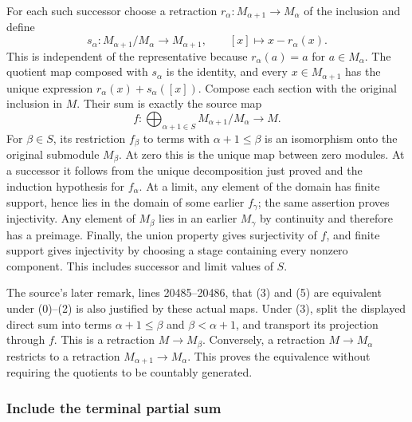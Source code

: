 For each such successor choose a retraction \(r_\alpha:M_{\alpha+1}\to M_\alpha\) of the inclusion and define \[
s_\alpha:M_{\alpha+1}/M_\alpha\longrightarrow M_{\alpha+1},
\qquad [x]\longmapsto x-r_\alpha(x).
\] This is independent of the representative because \(r_\alpha(a)=a\) for \(a\in M_\alpha\). The quotient map composed with \(s_\alpha\) is the identity, and every \(x\in M_{\alpha+1}\) has the unique expression \(r_\alpha(x)+s_\alpha([x])\). Compose each section with the original inclusion in \(M\). Their sum is exactly the source map \[
f:\bigoplus_{\alpha+1\in S}M_{\alpha+1}/M_\alpha\longrightarrow M.
\] For \(\beta\in S\), its restriction \(f_\beta\) to terms with \(\alpha+1\leq\beta\) is an isomorphism onto the original submodule \(M_\beta\). At zero this is the unique map between zero modules. At a successor it follows from the unique decomposition just proved and the induction hypothesis for \(f_\alpha\). At a limit, any element of the domain has finite support, hence lies in the domain of some earlier \(f_\gamma\); the same assertion proves injectivity. Any element of \(M_\beta\) lies in an earlier \(M_\gamma\) by continuity and therefore has a preimage. Finally, the union property gives surjectivity of \(f\), and finite support gives injectivity by choosing a stage containing every nonzero component. This includes successor and limit values of \(S\).

The source's later remark, lines 20485--20486, that (3) and (5) are equivalent under (0)--(2) is also justified by these actual maps. Under (3), split the displayed direct sum into terms \(\alpha+1\leq\beta\) and \(\beta<\alpha+1\), and transport its projection through \(f\). This is a retraction \(M\to M_\beta\). Conversely, a retraction \(M\to M_\alpha\) restricts to a retraction \(M_{\alpha+1}\to M_\alpha\). This proves the equivalence without requiring the quotients to be countably generated.

\subsubsection{Include the terminal partial sum}\label{algebra-proof-011-include-the-terminal-partial-sum}

